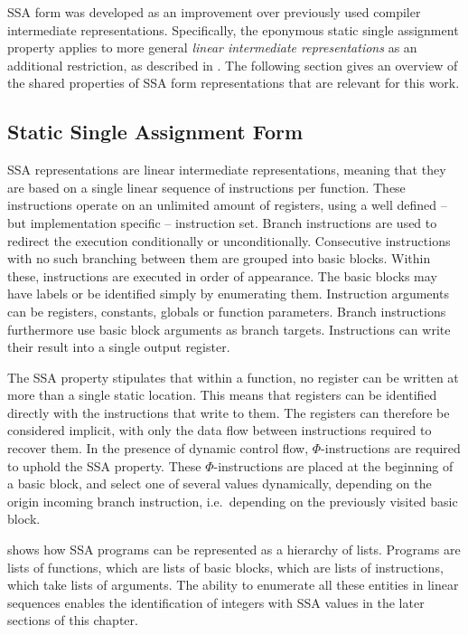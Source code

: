     SSA form was developed as an improvement over previously used compiler
    intermediate representations.
    Specifically, the eponymous static single assignment property applies to
    more general {\em linear intermediate representations} as an additional
    restriction, as described in \citet{Torczon:2007:EC:1526330}.
    The following section gives an overview of the shared properties of SSA form
    representations that are relevant for this work.

\subsection{Static Single Assignment Form}

    SSA representations are linear intermediate representations, meaning that
    they are based on a single linear sequence of instructions per function.
    These instructions operate on an unlimited amount of registers, using a well
    defined -- but implementation specific -- instruction set.
    Branch instructions are used to redirect the execution conditionally or
    unconditionally.
    Consecutive instructions with no such branching between them are grouped
    into basic blocks.
    Within these, instructions are executed in order of appearance.
    The basic blocks may have labels or be identified simply by enumerating
    them.
    Instruction arguments can be registers, constants, globals or function
    parameters.
    Branch instructions furthermore use basic block arguments as branch targets.
    Instructions can write their result into a single output register.

    The SSA property stipulates that within a function, no register can be
    written at more than a single static location.
    This means that registers can be identified directly with the instructions
    that write to them.
    The registers can therefore be considered implicit, with only the data flow
    between instructions required to recover them.
    In the presence of dynamic control flow, \mbox{$\Phi$-instructions} are
    required to uphold the SSA property.
    These \mbox{$\Phi$-instructions} are placed at the beginning of a basic
    block, and select one of several values dynamically, depending on the origin
    incoming branch instruction, i.e.\ depending on the previously visited
    basic block.

     shows how SSA programs can be represented as a
    hierarchy of lists.
    Programs are lists of functions, which are lists of basic blocks, which are
    lists of instructions, which take lists of arguments.
    The ability to enumerate all these entities in linear sequences enables the
    identification of integers with SSA values in the later sections of this
    chapter.


